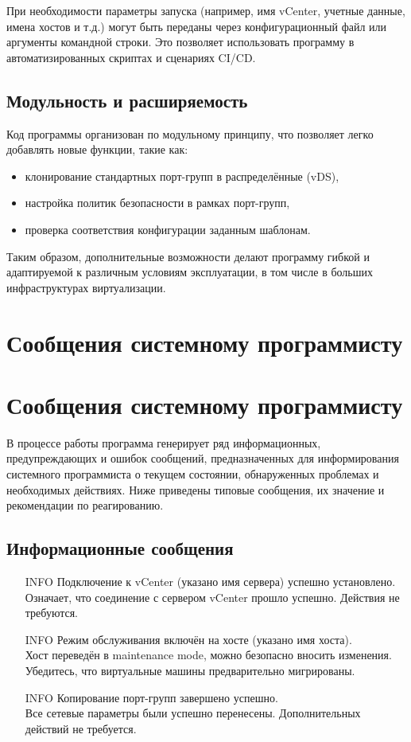 При необходимости параметры запуска (например, имя vCenter, учетные данные, имена хостов и т.д.) могут быть переданы через конфигурационный файл или аргументы командной строки. Это позволяет использовать программу в автоматизированных скриптах и сценариях CI/CD.

\subsection{Модульность и расширяемость}

Код программы организован по модульному принципу, что позволяет легко добавлять новые функции, такие как:
\begin{itemize}
  \item клонирование стандартных порт-групп в распределённые (vDS),
  \item настройка политик безопасности в рамках порт-групп,
  \item проверка соответствия конфигурации заданным шаблонам.
\end{itemize}

Таким образом, дополнительные возможности делают программу гибкой и адаптируемой к различным условиям эксплуатации, в том числе в больших инфраструктурах виртуализации.

\newpage
\section{Сообщения системному программисту}

\section{Сообщения системному программисту}

В процессе работы программа генерирует ряд информационных, предупреждающих и ошибок сообщений, предназначенных для информирования системного программиста о текущем состоянии, обнаруженных проблемах и необходимых действиях. Ниже приведены типовые сообщения, их значение и рекомендации по реагированию.

\subsection{Информационные сообщения}

\begin{itemize}
  \item [INFO] Подключение к vCenter (указано имя сервера) успешно установлено.\\
  Означает, что соединение с сервером vCenter прошло успешно. Действия не требуются.

  \item [INFO] Режим обслуживания включён на хосте (указано имя хоста).\\
  Хост переведён в maintenance mode, можно безопасно вносить изменения. Убедитесь, что виртуальные машины предварительно мигрированы.

  \item [INFO] Копирование порт-групп завершено успешно.\\
  Все сетевые параметры были успешно перенесены. Дополнительных действий не требуется.
\end{itemize}


